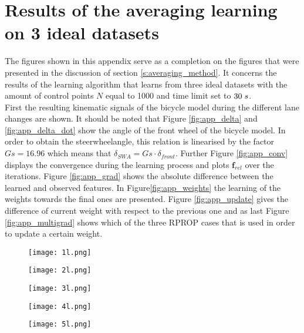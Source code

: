 \chapter{Results of the averaging learning on 3 ideal datasets}
\label{app:C}
The figures shown in this appendix serve as a completion on the figures that were presented in the discussion of section \ref{s:averaging_method}. It concerns the results of the learning algorithm that learns from three ideal datasets with the amount of control points $N$ equal to 1000 and time limit set to $30 \hspace{1mm}s$.\\ First the resulting kinematic signals of the bicycle model during the different lane changes are shown. It should be noted that Figure \ref{fig:app_delta} and \ref{fig:app_delta_dot} show the angle of the front wheel of the bicycle model. In order to obtain the steerwheelangle, this relation is linearised by the factor $Gs = 16.96$ which means that $\delta_{SWA} = Gs\cdot\delta_{front}$. Further Figure \ref{fig:app_conv} displays the convergence during the learning process and plots $\bm{f}_{rel}$ over the iterations. Figure \ref{fig:app_grad} shows the absolute difference between the learned and observed features. In Figure\ref{fig:app_weights} the learning of the weights towards the final ones are presented. Figure \ref{fig:app_update} gives the difference of current weight with respect to the previous one and as last Figure \ref{fig:app_multigrad} shows which of the three RPROP cases that is used in order to update a certain weight. 

 
\begin{figure}[h!]
	\texttt{[image: 1l.png]}
\end{figure}

\begin{figure}[h!]
	\centering
	\texttt{[image: 2l.png]}
	\label{fig:lat_acc_val}
\end{figure}

\begin{figure}[h!]
	\centering
	\texttt{[image: 3l.png]}
	\label{fig:lat_acc_val}
\end{figure}


\begin{figure}[h!]
	\centering
	\texttt{[image: 4l.png]}
	\label{fig:lat_acc_val}
\end{figure}


\begin{figure}[h!]
	\centering
	\texttt{[image: 5l.png]}
	\label{fig:lat_acc_val}
\end{figure}



